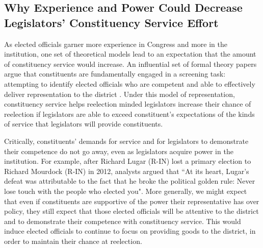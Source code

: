 \documentclass{article}
\begin{document}
\subsection{Why Experience and Power Could Decrease Legislators' Constituency Service Effort}
As elected officials garner more experience in Congress and more in the institution, one set of theoretical models lead to an expectation that the amount of constituency service would increase.  An influential set of formal theory papers argue that constituents are fundamentally engaged in a screening task: attempting to identify elected officials who are competent and able to effectively deliver representation to the district \citep{AshworthBuenodeMesquita2006, gordon2009advantages}.  Under this model of representation, constituency service helps reelection minded legislators increase their chance of reelection if legislators are able to exceed constituent's expectations of the kinds of service that legislators will provide constituents.  

Critically, constituents' demands for service and for legislators to demonstrate their competence do not go away, even as legislators acquire power in the institution.  For example, after Richard Lugar (R-IN) lost a primary election to Richard Mourdock (R-IN) in 2012, analysts argued that ``At its heart, Lugar's defeat was attributable to the fact that he broke the political golden rule: Never lose touch with the people who elected you".  More generally, we might expect that even if constituents are supportive of the power their representative has over policy, they still expect that those elected officials will be attentive to the district and to demonstrate their competence with constituency service.  This would induce elected officials to continue to focus on providing goods to the district, in order to maintain their chance at reelection.       %

\end{document}
